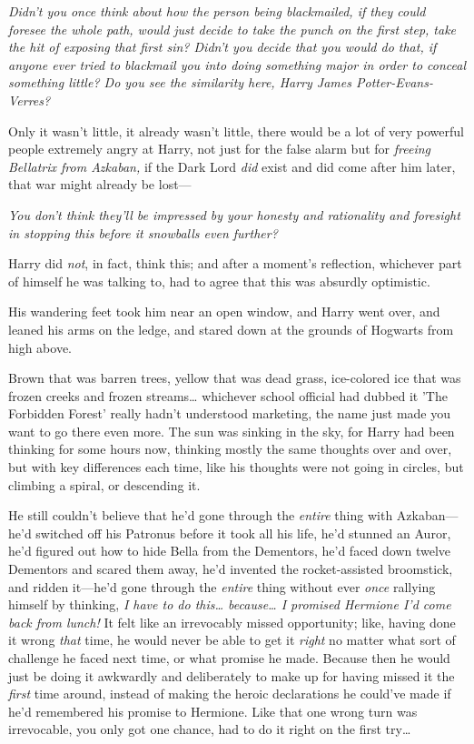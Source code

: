\emph{Didn't you once think about how the person being blackmailed, if they 
could foresee the whole path, would just decide to take the punch on the first 
step, take the hit of exposing that first sin? Didn't you decide that you would 
do that, if anyone ever tried to blackmail you into doing something major in 
order to conceal something little? Do you see the similarity here, Harry James 
Potter-Evans-Verres?}

Only it wasn't little, it already wasn't little, there would be a lot of very 
powerful people extremely angry at Harry, not just for the false alarm but for 
\emph{freeing Bellatrix from Azkaban,} if the Dark Lord \emph{did} exist and 
did come after him later, that war might already be lost---

\emph{You don't think they'll be impressed by your honesty and rationality and 
foresight in stopping this before it snowballs even further?}

Harry did \emph{not}, in fact, think this; and after a moment's reflection, 
whichever part of himself he was talking to, had to agree that this was 
absurdly optimistic.

His wandering feet took him near an open window, and Harry went over, and 
leaned his arms on the ledge, and stared down at the grounds of Hogwarts from 
high above.

Brown that was barren trees, yellow that was dead grass, ice-colored ice that 
was frozen creeks and frozen streams{\ldots} whichever school official had 
dubbed it 'The Forbidden Forest' really hadn't understood marketing, the name 
just made you want to go there even more. The sun was sinking in the sky, for 
Harry had been thinking for some hours now, thinking mostly the same thoughts 
over and over, but with key differences each time, like his thoughts were not 
going in circles, but climbing a spiral, or descending it.

He still couldn't believe that he'd gone through the \emph{entire} thing with 
Azkaban---he'd switched off his Patronus before it took all his life, he'd 
stunned an Auror, he'd figured out how to hide Bella from the Dementors, he'd 
faced down twelve Dementors and scared them away, he'd invented the 
rocket-assisted broomstick, and ridden it---he'd gone through the \emph{entire} 
thing without ever \emph{once} rallying himself by thinking, \emph{I have to do 
this{\ldots} because{\ldots} I promised Hermione I'd come back from lunch!} It 
felt like an irrevocably missed opportunity; like, having done it wrong 
\emph{that} time, he would never be able to get it \emph{right} no matter what 
sort of challenge he faced next time, or what promise he made. Because then he 
would just be doing it awkwardly and deliberately to make up for having missed 
it the \emph{first} time around, instead of making the heroic declarations he 
could've made if he'd remembered his promise to Hermione. Like that one wrong 
turn was irrevocable, you only got one chance, had to do it right on the first 
try{\ldots}

